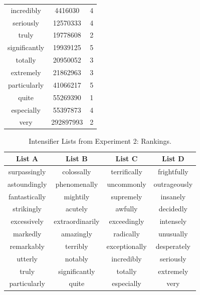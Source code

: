 \documentclass[10pt,letterpaper]{article}
\begin{document}
\begin{table}[ht]
\begin{center}
\begin{tabular}{ccc}
    incredibly & 4416030 & 4 \\
    seriously & 12570333 & 4 \\
    truly & 19778608 & 2 \\
    significantly & 19939125 & 5 \\
    totally & 20950052 & 3 \\
    extremely & 21862963 & 3 \\
    particularly & 41066217 & 5 \\
    quite & 55269390 & 1 \\
    especially & 55397873 & 4 \\
    very & 292897993 & 2
  \end{tabular}
 \end{center}
\end{table}


\begin{table}[ht]
\begin{center} 
\caption{Intensifier Lists from Experiment 2: Rankings.} 
\label{exp2-intensifiers} 
\vskip 0.12in
\begin{tabular}{cccc} 
\hline
List A    &  List B & List C & List D \\
\hline
surpassingly & colossally & terrifically & frightfully \\
astoundingly & phenomenally & uncommonly & outrageously \\
fantastically & mightily & supremely & insanely \\
strikingly & acutely & awfully & decidedly \\
excessively & extraordinarily & exceedingly & intensely \\
markedly & amazingly & radically & unusually \\
remarkably & terribly & exceptionally & desperately \\
utterly & notably & incredibly & seriously \\
truly & significantly & totally & extremely \\
particularly & quite & especially & very
\end{tabular}
\end{center}
\end{table}



\setlength{\bibleftmargin}{.125in}
\setlength{\bibindent}{-\bibleftmargin}


\end{document}
